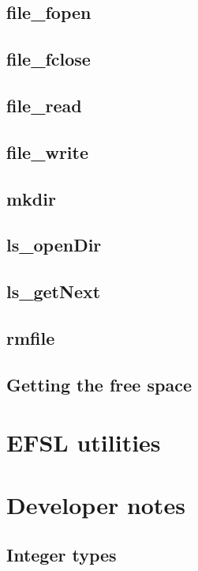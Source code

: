 \documentclass[a4paper,fleqn]{article}
\begin{document}
\subsection{file\_fopen}
	
	\newpage
\subsection{file\_fclose}
	
	\newpage
\subsection{file\_read}
	
	\newpage
\subsection{file\_write}
	
	\newpage
\subsection{mkdir}
	
	\newpage
\subsection{ls\_openDir}
	
	\newpage
\subsection{ls\_getNext}
	
	\newpage
\subsection{rmfile}
	
	\newpage
\subsection{Getting the free space}
	
	\newpage

\newpage
\section{EFSL utilities}
	
	\newpage

\newpage
\section{Developer notes}
\subsection{Integer types}
	
\end{document}
